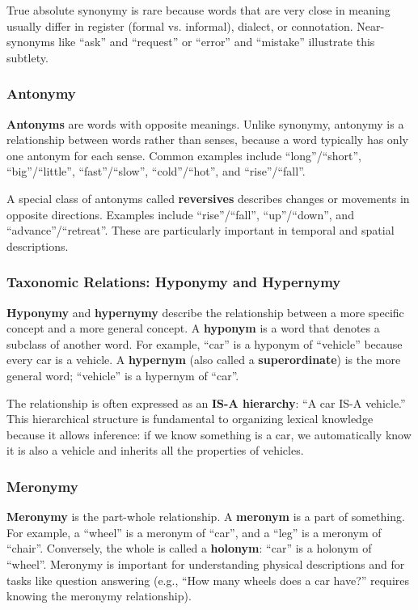 \documentclass[11pt,a4paper]{article}
\begin{document}
True absolute synonymy is rare because words that are very close in meaning usually differ in register (formal vs. informal), dialect, or connotation. Near-synonyms like ``ask'' and ``request'' or ``error'' and ``mistake'' illustrate this subtlety.

\subsubsection{Antonymy}

\textbf{Antonyms} are words with opposite meanings. Unlike synonymy, antonymy is a relationship between words rather than senses, because a word typically has only one antonym for each sense. Common examples include ``long''/``short'', ``big''/``little'', ``fast''/``slow'', ``cold''/``hot'', and ``rise''/``fall''.

A special class of antonyms called \textbf{reversives} describes changes or movements in opposite directions. Examples include ``rise''/``fall'', ``up''/``down'', and ``advance''/``retreat''. These are particularly important in temporal and spatial descriptions.

\subsubsection{Taxonomic Relations: Hyponymy and Hypernymy}

\textbf{Hyponymy} and \textbf{hypernymy} describe the relationship between a more specific concept and a more general concept. A \textbf{hyponym} is a word that denotes a subclass of another word. For example, ``car'' is a hyponym of ``vehicle'' because every car is a vehicle. A \textbf{hypernym} (also called a \textbf{superordinate}) is the more general word; ``vehicle'' is a hypernym of ``car''.

The relationship is often expressed as an \textbf{IS-A hierarchy}: ``A car IS-A vehicle.'' This hierarchical structure is fundamental to organizing lexical knowledge because it allows inference: if we know something is a car, we automatically know it is also a vehicle and inherits all the properties of vehicles.

\subsubsection{Meronymy}

\textbf{Meronymy} is the part-whole relationship. A \textbf{meronym} is a part of something. For example, a ``wheel'' is a meronym of ``car'', and a ``leg'' is a meronym of ``chair''. Conversely, the whole is called a \textbf{holonym}: ``car'' is a holonym of ``wheel''. Meronymy is important for understanding physical descriptions and for tasks like question answering (e.g., ``How many wheels does a car have?'' requires knowing the meronymy relationship).
\end{document}
